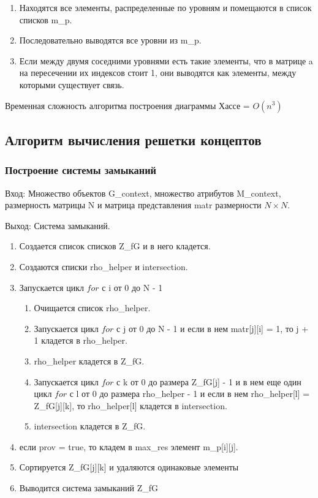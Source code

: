 \documentclass[bachelor, och, labwork]{shiza}
\begin{document}
	\begin{enumerate} 
		\item Находятся все элементы, распределенные по уровням и помещаются в список списков m\_p.
		\item Последовательно выводятся все уровни из m\_p.
		\item Если между двумя соседними уровнями есть такие элементы, что в матрице a на пересечении их индексов стоит 1, они выводятся как элементы, между которыми существует связь.
	\end{enumerate} 
	
		Временная сложность алгоритма построения диаграммы Хассе = $O(n^3)$		
	
	\subsection{Алгоритм вычисления решетки концептов}		
	
		\subsubsection{Построение системы замыканий}		
	
	$\textit{Вход:}$ Множество объектов G\_context, множество атрибутов M\_context, размерность матрицы N и матрица представления matr размерности $N \times N$.
	
	$\textit{Выход:}$  Система замыканий.
		
	\begin{enumerate} 
		\item Создается список списков Z\_fG и в него кладется.
		\item Создаются списки rho\_helper и intersection.
		\item Запускается цикл $for$ с i от 0 до N - 1
		\begin{enumerate} 
			\item Очищается список rho\_helper.
			\item Запускается цикл $for$ с j от 0 до N - 1 и если в нем matr[j][i] = 1, то j + 1 кладется в rho\_helper.
			\item rho\_helper кладется в Z\_fG.
			\item Запускается цикл $for$ с k от 0 до размера Z\_fG[j] - 1 и в нем еще один цикл $for$ с l от 0 до размера rho\_helper - 1 и если в нем rho\_helper[l] = Z\_fG[j][k], то rho\_helper[l] кладется в intersection.
			\item intersection кладется в Z\_fG.
		\end{enumerate}
		\item если prov = true, то кладем в max\_res элемент m\_p[i][j].
		\item Сортируется Z\_fG[j][k] и удаляются одинаковые элементы
		\item Выводится система замыканий Z\_fG
	\end{enumerate} 
	
\end{document}
